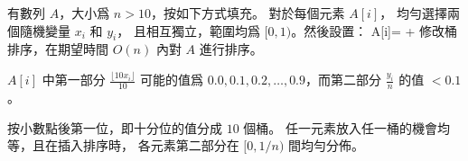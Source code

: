 
\startEXERCISE\DIFFICULT
有數列 $A$，大小爲 $n>10$，按如下方式填充。
對於每個元素 $A[i]$，
均勻選擇兩個隨機變量 $x_i$ 和 $y_i$，
且相互獨立，範圍均爲 $[0,1)$。然後設置：
\startformula
A[i]= + 
\stopformula
修改桶排序，在期望時間 $O(n)$ 內對 $A$ 進行排序。
\stopEXERCISE

\startANSWER
$A[i]$ 中第一部分 $\frac{\lfloor 10 x_i\rfloor}{10}$ 可能的值爲
 $0.0,0.1,0.2,\ldots,0.9$，而第二部分 $\frac{y_i}{n}$ 的值 $<0.1$。

按小數點後第一位，即十分位的值分成 $10$ 個桶。
任一元素放入任一桶的機會均等，且在插入排序時，
各元素第二部分在 $[0, 1/n)$ 間均勻分佈。
\stopANSWER
